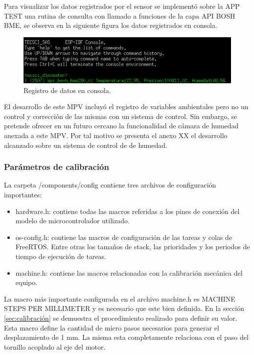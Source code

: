 Para visualizar los datos registrados por el sensor se implementó sobre la APP TEST una rutina de consulta con llamado a funciones de la capa API BOSH BME, se observa en la siguiente figura los datos registrados en consola.

\begin{figure}[h!]
	\centering
	\includegraphics[width=1\textwidth]{./Figures/registro_bme.png}
	\caption{Registro de datos en consola.}
	\label{fig:api_bosh}
\end{figure}

 
   

El desarrollo de este MPV incluyó el registro de variables ambientales pero no un control y corrección de las mismas con un sistema de control. Sin embargo, se pretende ofrecer en un futuro cercano la funcionalidad  de cámara de humedad anexada a este MPV. Por tal motivo se presenta el anexo XX el desarrollo alcanzado sobre un sistema de control de de humedad.  


 
\subsubsection{Parámetros de calibración}
\label{subsec:calibracion}

La carpeta /components/config contiene tres archivos de configuración importantes:
\begin{itemize}
\item hardware.h: contiene todas las macros referidas a los pines de conexión del modelo de microcontrolador utilizado.
\item os-config.h: contiene las macros de configuración de las tareas y colas de FreeRTOS. Entre otras los tamaños de stack, las prioridades y los periodos de tiempo de ejecución de tareas.
\item machine.h: contiene las macros relacionadas con la calibración mecánica del equipo.
\end{itemize}


La macro más importante configurada en el archivo machine.h es MACHINE STEPS PER MILLIMETER y es necesario que este bien definida. En la sección \ref{sec:calibración} se demuestra el procedimiento realizado para definir su valor. Esta macro define la cantidad de micro pasos necesarios para generar el desplazamiento de 1 mm. La misma esta completamente relaciona con el paso del tornillo acoplado al eje del motor.

